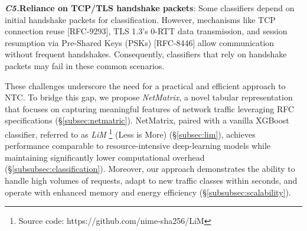 \textbf{\textit{C5.}Reliance on TCP/TLS handshake packets}: Some classifiers \cite{foundation_yatc_full} depend on initial handshake packets for classification. However, mechanisms like TCP connection reuse [RFC-9293], TLS 1.3's 0-RTT data transmission, and session resumption via Pre-Shared Keys (PSKs) [RFC-8446] allow communication without frequent handshakes. Consequently, classifiers that rely on handshake packets may fail in these common scenarios. 

These challenges underscore the need for a practical and efficient approach to NTC. To bridge this gap, we propose \textit{NetMatrix}, a novel tabular representation that focuses on capturing meaningful features of network traffic leveraging RFC specifications (\S \ref{subsec:netmatric}). NetMatrix, paired with a vanilla XGBoost classifier, referred to as \textit{LiM} \footnote{Source code: https://github.com/nime-sha256/LiM} (Less is More) (\S \ref{subsec:lim}), achieves performance comparable to resource-intensive deep-learning models while maintaining significantly lower computational overhead (\S \ref{subsubsec:classification}). Moreover, our approach demonstrates the ability to handle high volumes of requests, adapt to new traffic classes within seconds, and operate with enhanced memory and energy efficiency (\S \ref{subsubsec:scalability}).






